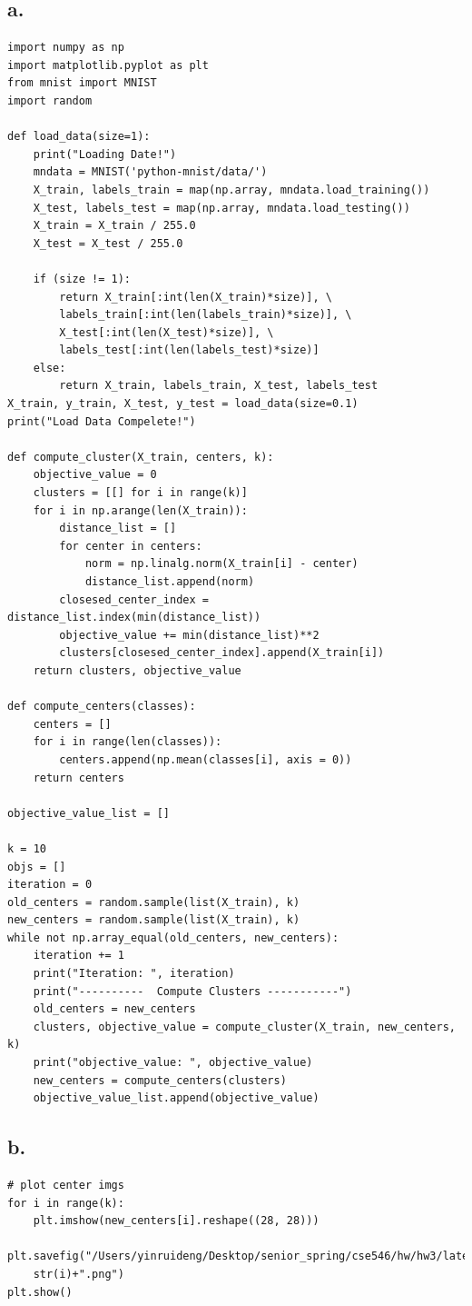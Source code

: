 \documentclass{article}
\begin{document}
\subsection*{a.}
\begin{verbatim}
import numpy as np
import matplotlib.pyplot as plt
from mnist import MNIST
import random

def load_data(size=1):
	print("Loading Date!")
	mndata = MNIST('python-mnist/data/')
	X_train, labels_train = map(np.array, mndata.load_training())
	X_test, labels_test = map(np.array, mndata.load_testing())
	X_train = X_train / 255.0
	X_test = X_test / 255.0
	
	if (size != 1):
		return X_train[:int(len(X_train)*size)], \
		labels_train[:int(len(labels_train)*size)], \
		X_test[:int(len(X_test)*size)], \
		labels_test[:int(len(labels_test)*size)]
	else:
		return X_train, labels_train, X_test, labels_test
X_train, y_train, X_test, y_test = load_data(size=0.1)
print("Load Data Compelete!")

def compute_cluster(X_train, centers, k):
	objective_value = 0
	clusters = [[] for i in range(k)]
	for i in np.arange(len(X_train)):
		distance_list = []
		for center in centers:
			norm = np.linalg.norm(X_train[i] - center)
			distance_list.append(norm)
		closesed_center_index = distance_list.index(min(distance_list))
		objective_value += min(distance_list)**2
		clusters[closesed_center_index].append(X_train[i])
	return clusters, objective_value

def compute_centers(classes):
	centers = []
	for i in range(len(classes)):
		centers.append(np.mean(classes[i], axis = 0))
	return centers

objective_value_list = []

k = 10
objs = []
iteration = 0
old_centers = random.sample(list(X_train), k)
new_centers = random.sample(list(X_train), k)
while not np.array_equal(old_centers, new_centers):
	iteration += 1
	print("Iteration: ", iteration)
	print("----------  Compute Clusters -----------")
	old_centers = new_centers
	clusters, objective_value = compute_cluster(X_train, new_centers, k)
	print("objective_value: ", objective_value)
	new_centers = compute_centers(clusters)
	objective_value_list.append(objective_value)

\end{verbatim}

\subsection*{b.}
\begin{verbatim}
# plot center imgs
for i in range(k):
	plt.imshow(new_centers[i].reshape((28, 28)))
	plt.savefig("/Users/yinruideng/Desktop/senior_spring/cse546/hw/hw3/latex/plots/A4/A4b_"+
	str(i)+".png")
plt.show()
\end{verbatim}
\end{document}
